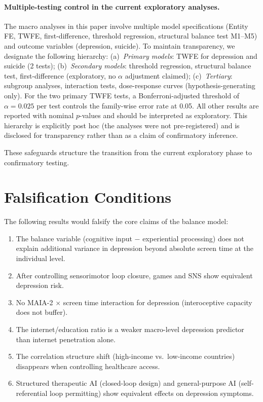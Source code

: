 \documentclass[a4paper,11pt,titlepage]{article}
\begin{document}
\paragraph{Multiple-testing control in the current exploratory analyses.}
The macro analyses in this paper involve multiple model specifications (Entity FE, TWFE, first-difference, threshold regression, structural balance test M1--M5) and outcome variables (depression, suicide). To maintain transparency, we designate the following hierarchy: (a)~\textit{Primary models}: TWFE for depression and suicide (2 tests); (b)~\textit{Secondary models}: threshold regression, structural balance test, first-difference (exploratory, no $\alpha$ adjustment claimed); (c)~\textit{Tertiary}: subgroup analyses, interaction tests, dose-response curves (hypothesis-generating only). For the two primary TWFE tests, a Bonferroni-adjusted threshold of $\alpha = 0.025$ per test controls the family-wise error rate at 0.05. All other results are reported with nominal $p$-values and should be interpreted as exploratory. This hierarchy is explicitly post hoc (the analyses were not pre-registered) and is disclosed for transparency rather than as a claim of confirmatory inference.

These safeguards structure the transition from the current exploratory phase to confirmatory testing.


\section{Falsification Conditions}\label{sec:falsification}

The following results would falsify the core claims of the balance model:

\begin{enumerate}
  \item The balance variable (cognitive input $-$ experiential processing) does not explain additional variance in depression beyond absolute screen time at the individual level.
  \item After controlling sensorimotor loop closure, games and SNS show equivalent depression risk.
  \item No MAIA-2 $\times$ screen time interaction for depression (interoceptive capacity does not buffer).
  \item The internet/education ratio is a weaker macro-level depression predictor than internet penetration alone.
  \item The correlation structure shift (high-income vs.\ low-income countries) disappears when controlling healthcare access.
  \item Structured therapeutic AI (closed-loop design) and general-purpose AI (self-referential loop permitting) show equivalent effects on depression symptoms.
\end{enumerate}
\end{document}
